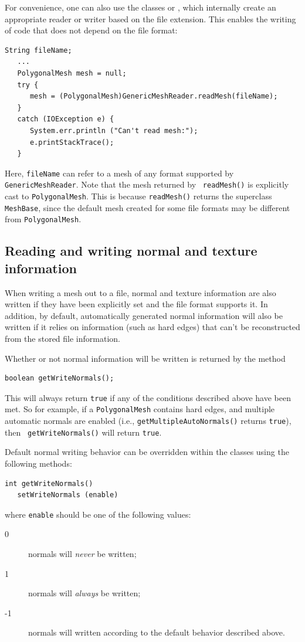 For convenience, one can also use the classes
 or
, which internally
create an appropriate reader or writer based on the file
extension. This enables the writing of code
that does not depend on the file format:
%
\begin{lstlisting}[]
   String fileName;
   ...
   PolygonalMesh mesh = null;
   try {
      mesh = (PolygonalMesh)GenericMeshReader.readMesh(fileName);
   }
   catch (IOException e) {
      System.err.println ("Can't read mesh:");
      e.printStackTrace();
   }
\end{lstlisting}
%
Here, {\tt fileName} can refer to a mesh of any format supported by
{\tt GenericMeshReader}. Note that the mesh returned by {\tt
readMesh()} is explicitly cast to {\tt PolygonalMesh}.  This is
because {\tt readMesh()} returns the superclass {\tt MeshBase}, since
the default mesh created for some file formats may be different from
{\tt PolygonalMesh}.

\subsection{Reading and writing normal and texture information}

When writing a mesh out to a file, normal and texture information are
also written if they have been explicitly set and the file format
supports it. In addition, by default, automatically generated normal
information will also be written if it relies on information (such as
hard edges) that can't be reconstructed from the stored file
information.

Whether or not normal information will be written is returned by the
method
\begin{lstlisting}[]
   boolean getWriteNormals();
\end{lstlisting}
%
This will always return {\tt true} if any of the conditions described
above have been met.  So for example, if a {\tt PolygonalMesh}
contains hard edges, and multiple automatic normals are enabled (i.e.,
{\tt getMultipleAutoNormals()} returns {\tt true}), then {\tt
getWriteNormals()} will return {\tt true}.

Default normal writing behavior can be overridden within 
the  classes
using the following methods:
\begin{lstlisting}[]
   int getWriteNormals()
   setWriteNormals (enable)
\end{lstlisting}
%
where {\tt enable} should be one of the following values:
\begin{description}
\item[ 0] normals will {\it never} be written;
\item[ 1] normals will {\it always} be written;
\item[-1] normals will written according to the default behavior 
described above.
\end{description}

